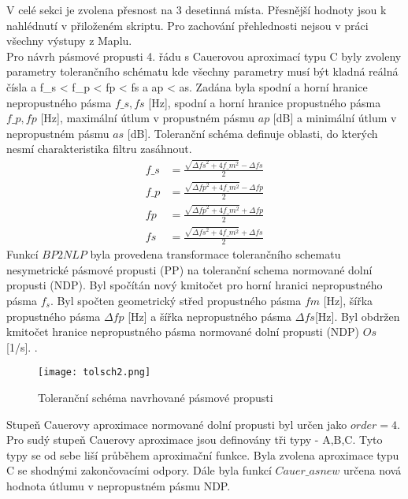 V celé sekci je zvolena přesnost na 3 desetinná místa. Přesnější hodnoty jsou k nahlédnutí v přiloženém skriptu. Pro zachování přehlednosti nejsou v práci všechny výstupy z Maplu.\\
Pro návrh pásmové propusti 4. řádu s Cauerovou aproximací typu C byly zvoleny parametry tolerančního schématu 
\noindent kde všechny parametry musí být kladná reálná čísla a f\_s <  f\_p < fp < fs a ap < as. Zadána byla spodní a horní hranice nepropustného pásma $f\_s,fs$ [Hz], spodní a horní hranice propustného pásma $f\_p,fp$ [Hz], maximální útlum v propustném pásmu $ap$ [dB] a minimální útlum v nepropustném pásmu $as$ [dB]. Toleranční schéma definuje oblasti, do kterých nesmí charakteristika filtru zasáhnout.
\begin{align}
f\_s &= \frac{\sqrt{\Delta{fs}^2+4f\_m ^2}-\Delta{fs}}{2}\\
f\_p &= \frac{\sqrt{\Delta{fp}^2+4f\_m ^2}-\Delta{fp}}{2}\\
fp &= \frac{\sqrt{\Delta{fp}^2+4f\_m ^2}+\Delta{fp}}{2}\\
fs &= \frac{\sqrt{\Delta{fs}^2+4f\_m ^2}+\Delta{fs}}{2}
\end{align}
Funkcí $BP2NLP$ byla provedena transformace tolerančního schematu nesymetrické pásmové propusti (PP) na toleranční schema normované dolní propusti (NDP). Byl spočítán nový kmitočet pro horní hranici nepropustného pásma $f_s$. Byl spočten geometrický střed propustného pásma $fm$ [Hz], šířka propustného pásma $\Delta{fp}$ [Hz] a šířka nepropustného pásma $\Delta{fs} $[Hz].
\noindent Byl obdržen kmitočet hranice nepropustného pásma normované dolní propusti (NDP) $Os$ [1/s].
.
\begin{figure}[h]
\centering
\texttt{[image: tolsch2.png]}
\caption{Toleranční schéma navrhované pásmové propusti}
\end{figure}
\noindent Stupeň Cauerovy aproximace normované dolní propusti byl určen jako $order = 4$. Pro sudý stupeň Cauerovy aproximace jsou definovány tři typy - A,B,C. Tyto typy se od sebe liší průběhem aproximační funkce. Byla zvolena aproximace typu C se shodnými zakončovacími odpory.
\noindent Dále byla funkcí $Cauer\_asnew$ určena nová hodnota útlumu v nepropustném pásmu NDP.
